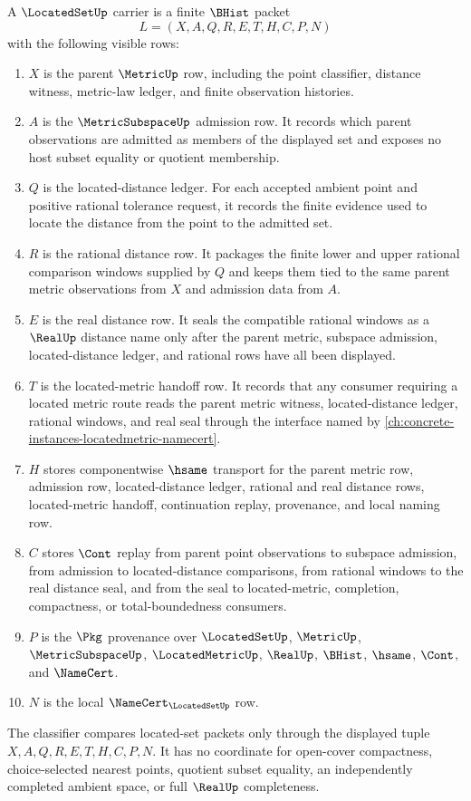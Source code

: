 \begin{definition}
\label{def:located-set-carrier}
A $\LocatedSetUp$ carrier is a finite $\BHist$ packet
$$
L=(X,A,Q,R,E,T,H,C,P,N)
$$
with the following visible rows:
\begin{enumerate}
\item $X$ is the parent $\MetricUp$ row, including the point classifier, distance witness, metric-law ledger, and finite observation histories.
\item $A$ is the $\MetricSubspaceUp$ admission row. It records which parent observations are admitted as members of the displayed set and exposes no host subset equality or quotient membership.
\item $Q$ is the located-distance ledger. For each accepted ambient point and positive rational tolerance request, it records the finite evidence used to locate the distance from the point to the admitted set.
\item $R$ is the rational distance row. It packages the finite lower and upper rational comparison windows supplied by $Q$ and keeps them tied to the same parent metric observations from $X$ and admission data from $A$.
\item $E$ is the real distance row. It seals the compatible rational windows as a $\RealUp$ distance name only after the parent metric, subspace admission, located-distance ledger, and rational rows have all been displayed.
\item $T$ is the located-metric handoff row. It records that any consumer requiring a located metric route reads the parent metric witness, located-distance ledger, rational windows, and real seal through the interface named by \autoref{ch:concrete-instances-locatedmetric-namecert}.
\item $H$ stores componentwise $\hsame$ transport for the parent metric row, admission row, located-distance ledger, rational and real distance rows, located-metric handoff, continuation replay, provenance, and local naming row.
\item $C$ stores $\Cont$ replay from parent point observations to subspace admission, from admission to located-distance comparisons, from rational windows to the real distance seal, and from the seal to located-metric, completion, compactness, or total-boundedness consumers.
\item $P$ is the $\Pkg$ provenance over $\LocatedSetUp$, $\MetricUp$, $\MetricSubspaceUp$, $\LocatedMetricUp$, $\RealUp$, $\BHist$, $\hsame$, $\Cont$, and $\NameCert$.
\item $N$ is the local $\NameCert_{\LocatedSetUp}$ row.
\end{enumerate}
The classifier compares located-set packets only through the displayed tuple $X,A,Q,R,E,T,H,C,P,N$. It has no coordinate for open-cover compactness, choice-selected nearest points, quotient subset equality, an independently completed ambient space, or full $\RealUp$ completeness.
\end{definition}

